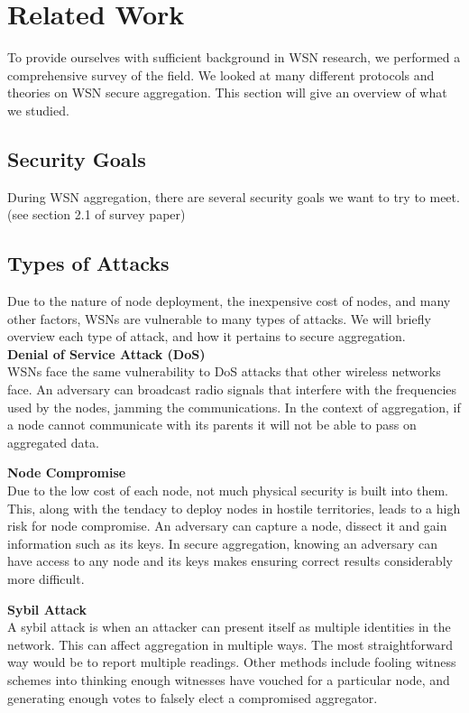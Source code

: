 \documentclass[a4paper]{article}
\begin{document}
\section{Related Work}
\label{sec:relatedwork}

To provide ourselves with sufficient background in WSN research, we performed
a comprehensive survey of the field. We looked at many different protocols and
theories on WSN secure aggregation. This section will give an overview of what
we studied.

\subsection{Security Goals}

During WSN aggregation, there are several security goals we want to try to
meet. (see section 2.1 of survey paper)

\subsection{Types of Attacks}

Due to the nature of node deployment, the inexpensive cost of nodes, and many
other factors, WSNs are vulnerable to many types of attacks. We will briefly
overview each type of attack, and how it pertains to secure aggregation.\\

{\bf Denial of Service Attack (DoS)} \\
WSNs face the same vulnerability to DoS attacks that other wireless
networks face. An adversary can broadcast radio signals that interfere with
the frequencies used by the nodes, jamming the communications. In the context
of aggregation, if a node cannot communicate with its parents it will not be
able to pass on aggregated data.

{\bf Node Compromise} \\
Due to the low cost of each node, not much physical security is built into
them. This, along with the tendacy to deploy nodes in hostile territories,
leads to a high risk for node compromise. An adversary can capture a node,
dissect it and gain information such as its keys. In secure aggregation,
knowing an adversary can have access to any node and its keys makes ensuring
correct results considerably more difficult.

{\bf Sybil Attack} \\
A sybil attack is when an attacker can present itself as multiple identities
in the network. This can affect aggregation in multiple ways. The most
straightforward way would be to report multiple readings. Other methods
include fooling witness schemes into thinking enough witnesses have vouched
for a particular node, and generating enough votes to falsely elect a
compromised aggregator.
\end{document}
